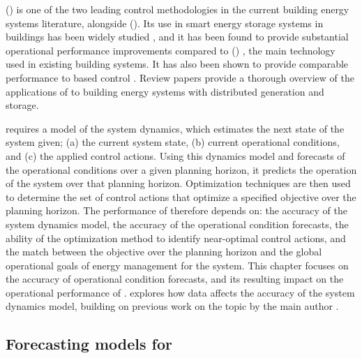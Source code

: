  () is one of the two leading control methodologies in the current building energy systems literature, alongside  (). Its use in smart energy storage systems in buildings has been widely studied \citep{zhou2021IncorporatingDeepLearning,deng2023EvaluationDeployingDatadriven,souto2018ScenarioBasedDecentralizedMPC,touretzky2014IntegratingSchedulingControl,lee2020ModelPredictiveControl}, and it has been found to provide substantial operational performance improvements compared to  () \citep{lee2020ModelPredictiveControl,erfani2021AnalysisImpactPredictive,oldewurtel2012UseModelPredictive}, the main technology used in existing building systems. It has also been shown to provide comparable performance to  based control \citep{zhan2023ComparingModelPredictive}. Review papers \citep{wang2022ScienceMappingApproach,thieblemont2017PredictiveControlStrategies,farrokhifar2021ModelPredictiveControl} provide a thorough overview of the applications of  to building energy systems with distributed generation and storage.

 requires a model of the system dynamics, which estimates the next state of the system given; (a) the current system state, (b) current operational conditions, and (c) the applied control actions. Using this dynamics model and forecasts of the operational conditions over a given planning horizon, it predicts the operation of the system over that planning horizon. Optimization techniques are then used to determine the set of control actions that optimize a specified objective over the planning horizon. The performance of  therefore depends on: the accuracy of the system dynamics model, the accuracy of the operational condition forecasts, the ability of the optimization method to identify near-optimal control actions, and the match between the objective over the planning horizon and the global operational goals of energy management for the system. This chapter focuses on the accuracy of operational condition forecasts, and its resulting impact on the operational performance of . \citep{raisch2025AdaptingChangeComparison} explores how data affects the accuracy of the system dynamics model, building on previous work on the topic by the main author \citep{raisch2025GenTLGeneralTransfer}.


\subsection{Forecasting models for }

